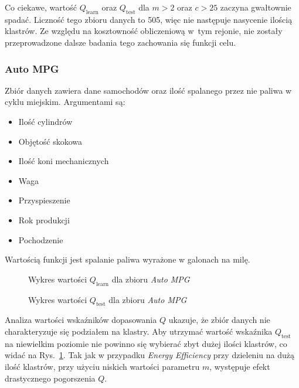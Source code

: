 \documentclass[a4paper; 11pt]{article}
\begin{document}
Co ciekawe, wartość $Q_\text{learn}$ oraz $Q_\text{test}$ dla $m > 2$ oraz $c > 25$
zaczyna gwałtownie spadać.
Liczność tego zbioru danych to 505, więc nie następuje nasycenie ilością klastrów.
Ze względu na kosztowność obliczeniową w~tym rejonie, nie zostały
przeprowadzone dalsze badania tego zachowania się funkcji celu.

\subsubsection{Auto MPG}
Zbiór danych zawiera dane samochodów oraz ilość spalanego przez nie paliwa w cyklu miejskim. Argumentami są:

\begin{itemize}
\item Ilość cylindrów
\item Objętość skokowa
\item Ilość koni mechanicznych
\item Waga
\item Przyspieszenie
\item Rok produkcji
\item Pochodzenie
\end{itemize}

Wartością funkcji jest spalanie paliwa wyrażone w galonach na milę.

\begin{figure}[h]
    \centering
    \begin{minipage}{0.45\textwidth}
        \centering
        \resizebox{1.2\textwidth}{!}{}
        \caption{Wykres wartości $Q_\text{learn}$ dla zbioru \emph{Auto MPG}}
        \label{fig:mpg_learn}
    \end{minipage}\hfill
    \begin{minipage}{0.45\textwidth}
        \centering
        \resizebox{1.2\textwidth}{!}{}
        \caption{Wykres wartości $Q_\text{test}$ dla zbioru \emph{Auto MPG}}
        \label{fig:mpg_test}
    \end{minipage}
\end{figure}

Analiza wartości wskaźników dopasowania $Q$ ukazuje, że zbiór danych nie
charakteryzuje się podziałem na klastry.
Aby utrzymać wartość wskaźnika $Q_\text{test}$ na niewielkim poziomie nie
powinno się wybierać zbyt dużej ilości klastrów, co widać na Rys.~\ref{fig:mpg_test}.
Tak jak w przypadku \emph{Energy Efficiency} przy dzieleniu na dużą ilość klastrów,
przy użyciu niskich wartości parametru $m$, występuje efekt drastycznego pogorszenia $Q$.
\end{document}
